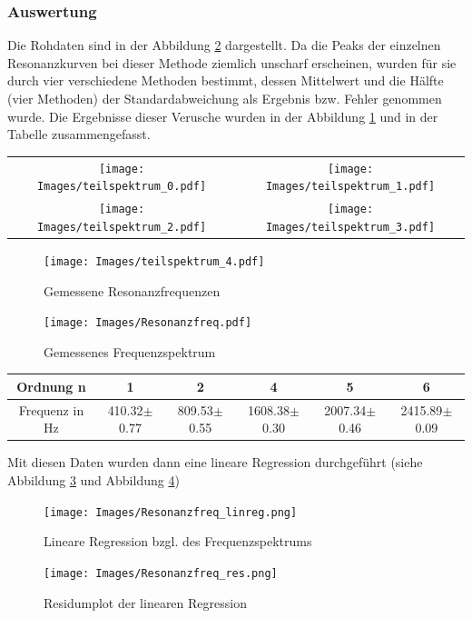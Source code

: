 \documentclass[]{article}
\begin{document}
	\subsubsection{Auswertung}
	
	Die Rohdaten sind in der Abbildung \ref{Resfreq} dargestellt. Da die Peaks der einzelnen Resonanzkurven bei dieser Methode ziemlich unscharf erscheinen, wurden für sie durch vier verschiedene Methoden bestimmt, dessen Mittelwert und die Hälfte (vier Methoden) der Standardabweichung als Ergebnis bzw. Fehler genommen wurde. Die Ergebnisse dieser Verusche wurden in der Abbildung \ref{Resfreq_teil} und in der Tabelle zusammengefasst.\\
	\begin{center}
	\begin{tabular}{cc}
		\texttt{[image: Images/teilspektrum\_0.pdf]}& \texttt{[image: Images/teilspektrum\_1.pdf]}\\
		\texttt{[image: Images/teilspektrum\_2.pdf]}& \texttt{[image: Images/teilspektrum\_3.pdf]}\\		 
	\end{tabular} 
	\begin{figure}[h]
		\begin{center}
			\texttt{[image: Images/teilspektrum\_4.pdf]}
			\caption{Gemessene Resonanzfrequenzen}
			\label{Resfreq_teil}
		\end{center}
	\end{figure}
	\end{center}
 
	\begin{figure}
		\begin{center}
			\texttt{[image: Images/Resonanzfreq.pdf]}
			\caption{Gemessenes Frequenzspektrum}
			\label{Resfreq}
		\end{center}
	\end{figure}

	\begin{tabular}{|c|c|c|c|c|c|}
		\hline 
		Ordnung n&1  &2  &4  &5 &6  \\ 
		\hline 
		Frequenz in Hz& 410.32$\pm$0.77 &809.53$\pm$0.55  &1608.38$\pm$0.30  &2007.34$\pm$0.46  &2415.89$\pm$0.09  \\ 
		\hline 
	\end{tabular}

	\bigskip
	Mit diesen Daten wurden dann eine lineare Regression durchgeführt (siehe Abbildung \ref{linreg_freq} und Abbildung \ref{linreg_res})
	\begin{figure}
		\begin{center}
			\texttt{[image: Images/Resonanzfreq\_linreg.png]}
			\caption{Lineare Regression bzgl. des Frequenzspektrums}
			\label{linreg_freq}
		\end{center}
	\end{figure}
	\begin{figure}
		\begin{center}
			\texttt{[image: Images/Resonanzfreq\_res.png]}
			\caption{Residumplot der linearen Regression}
			\label{linreg_res}
		\end{center}
	\end{figure}
\end{document}
